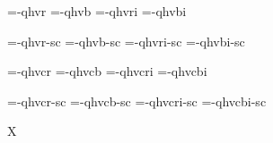 

\ifx\sizespec\undefined \def\sizespec{}\fi
\ifx\font\corkencoded {}\else {}\fi

\ifx\font\unicoded  
   \def\famname{texgyreheroscn} 
   \let\tenrmn=\tenrm \let\tenbfn=\tenbf \let\tenitn=\tenit \let\tenbin=\tenbi
   \let\tenrmnc=\tenrmc \let\tenbfnc=\tenbfc \let\tenitnc=\tenitc \let\tenbinc=\tenbic
   \def\famname{texgyreheros} 
\else

\font\tenrm=\tmp-qhvr  \sizespec
\font\tenbf=\tmp-qhvb  \sizespec
\font\tenit=\tmp-qhvri \sizespec
\font\tenbi=\tmp-qhvbi \sizespec

\font\tenrmc=\tmp-qhvr-sc  \sizespec
\font\tenbfc=\tmp-qhvb-sc  \sizespec
\font\tenitc=\tmp-qhvri-sc \sizespec
\font\tenbic=\tmp-qhvbi-sc \sizespec

\font\tenrmn=\tmp-qhvcr  \sizespec
\font\tenbfn=\tmp-qhvcb  \sizespec
\font\tenitn=\tmp-qhvcri \sizespec
\font\tenbin=\tmp-qhvcbi \sizespec

\font\tenrmnc=\tmp-qhvcr-sc  \sizespec
\font\tenbfnc=\tmp-qhvcb-sc  \sizespec
\font\tenitnc=\tmp-qhvcri-sc \sizespec
\font\tenbinc=\tmp-qhvcbi-sc \sizespec

\fi

\tenrm

\ifx\regfontdefault\undefined \else
   \regfontdefault
   \regfont\tenrmc \regfont\tenitc
   \regfont\tenbfc \regfont\tenbic
   \regfont\tenrmn \regfont\tenitn
   \regfont\tenbfn \regfont\tenbin
   \regfont\tenrmnc \regfont\tenitnc
   \regfont\tenbfnc \regfont\tenbinc   
\fi

\def\caps#1{{\escapechar=-1 \expandafter}%
  \expandafter\csname\expandafter\tenonlytext\string#1c\endcsname}
\def\tenonlytext{ten}

\def\narrow{%
  \let\tenrm=\tenrmn \let\tenbf=\tenbfn
  \let\tenit=\tenitn \let\tenbi=\tenbin 
  \let\tenrmc=\tenrmnc \let\tenbfc=\tenbfnc
  \let\tenitc=\tenitnc \let\tenbic=\tenbinc \tenrm}

\ifx\font\corkencoded\else \ifx\font\unicoded\else  \fi\fi
\ifx\mathpreloaded X\else  \fi                     



